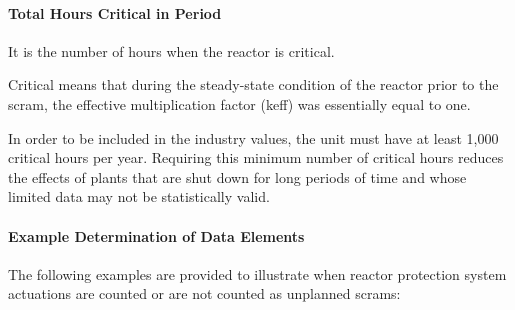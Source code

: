 \paragraph{Total Hours Critical in Period}
It is the number of hours when the reactor is critical.

Critical means that during the steady-state condition of the reactor
prior to the scram, the effective multiplication factor (keff) was
essentially equal to one.

In order to be included in the industry values, the unit must have at
least 1,000 critical hours per year. Requiring this minimum number of
critical hours reduces the effects of plants that are shut down for
long periods of time and whose limited data may not be statistically
valid.

\paragraph{Example Determination of Data Elements}

The following examples are provided to illustrate when reactor
protection system actuations are counted or are not counted as
unplanned scrams:

